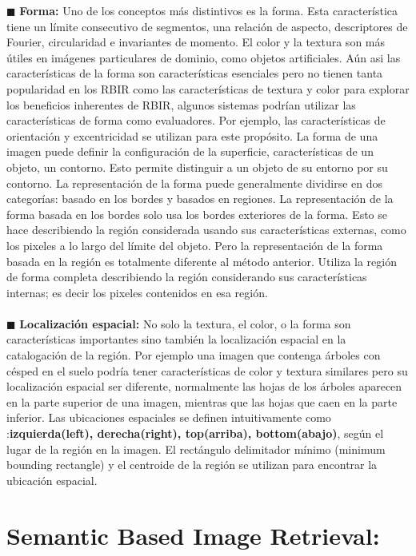 \documentclass{llncs}
\begin{document}
$\blacksquare$  \textbf{Forma:}
Uno de los conceptos m\'as distintivos es la forma. Esta caracter\'istica tiene un l\'imite consecutivo de segmentos, una relaci\'on 
de aspecto, descriptores de Fourier, circularidad e invariantes de momento. El color y la textura son m\'as \'utiles en im\'agenes 
particulares de dominio, como objetos artificiales. A\'un asi las caracter\'isticas de la forma son caracter\'isticas esenciales 
pero no tienen tanta popularidad en los RBIR como las caracter\'isticas de textura y color para explorar los beneficios inherentes de RBIR,
algunos sistemas podrían utilizar las características de forma como evaluadores. Por ejemplo, las características de orientación 
y excentricidad se utilizan para este propósito. La forma de una imagen puede definir la configuraci\'on de la superficie, caracter\'isticas
de un objeto, un contorno. Esto permite distinguir a un objeto de su entorno por su contorno. La representaci\'on de la forma puede 
generalmente dividirse en dos categor\'ias: basado en los bordes y basados en regiones. La representaci\'on de la forma basada en los 
bordes solo usa los bordes exteriores de la forma. Esto se hace describiendo la regi\'on considerada usando sus caracter\'isticas externas,
como los pixeles a lo largo del l\'imite del objeto. Pero la representaci\'on de la forma basada en la regi\'on es totalmente diferente 
al m\'etodo anterior. Utiliza la regi\'on de forma completa describiendo la regi\'on considerando sus caracter\'isticas internas; es 
decir los pixeles contenidos en esa regi\'on.\\
\\
$\blacksquare$  \textbf{Localizaci\'on espacial:}
No solo la textura, el color, o la forma son caracter\'isticas importantes sino tambi\'en la localizaci\'on espacial en la catalogaci\'on 
de la regi\'on. Por ejemplo una imagen que contenga \'arboles con c\'esped en el suelo podr\'ia tener caracter\'isticas de color y textura 
similares pero su localizaci\'on espacial ser diferente, normalmente las hojas de los \'arboles aparecen en la parte superior de una imagen,
mientras que las hojas que caen en la parte inferior. Las ubicaciones espaciales se definen intuitivamente como :\textbf{izquierda(left), derecha(right),
top(arriba), bottom(abajo)}, seg\'un el lugar de la regi\'on en la imagen. El rect\'angulo delimitador m\'inimo (minimum bounding rectangle) y 
el centroide de la regi\'on se utilizan para encontrar la ubicaci\'on espacial.     

\section{Semantic Based Image Retrieval:}
\end{document}
